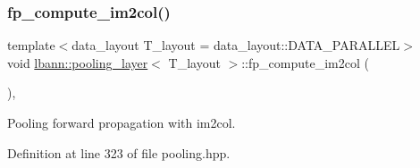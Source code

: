 \mbox{\label{classlbann_1_1pooling__layer_a76ce07a190fbe85685ea2ab4e53be7f9}} 
\subsubsection{\texorpdfstring{fp\+\_\+compute\+\_\+im2col()}{fp\_compute\_im2col()}}
{\footnotesize\ttfamily template$<$data\+\_\+layout T\+\_\+layout = data\+\_\+layout\+::\+D\+A\+T\+A\+\_\+\+P\+A\+R\+A\+L\+L\+EL$>$ \\
void \hyperlink{classlbann_1_1pooling__layer}{lbann\+::pooling\+\_\+layer}$<$ T\+\_\+layout $>$\+::fp\+\_\+compute\+\_\+im2col (\begin{DoxyParamCaption}{ }\end{DoxyParamCaption})\hspace{0.3cm}{\ttfamily [inline]}, {\ttfamily [private]}}



Pooling forward propagation with im2col. 



Definition at line 323 of file pooling.\+hpp.


